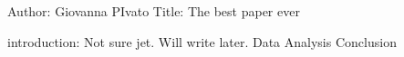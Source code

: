 Author: Giovanna PIvato
Title: The best paper ever

introduction: Not sure jet. Will write later.
Data
Analysis
Conclusion
